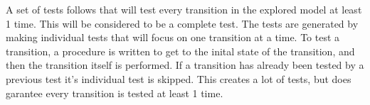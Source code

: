A set of tests follows that will test every transition in the explored model at least 1 time.
This will be considered to be a complete test.
The tests are generated by making individual tests that will focus on one transition at a time.
To test a transition, a procedure is written to get to the inital state of the transition, and then the transition itself is performed.
If a transition has already been tested by a previous test it's individual test is skipped.
This creates a lot of tests, but does garantee every transition is tested at least 1 time.
